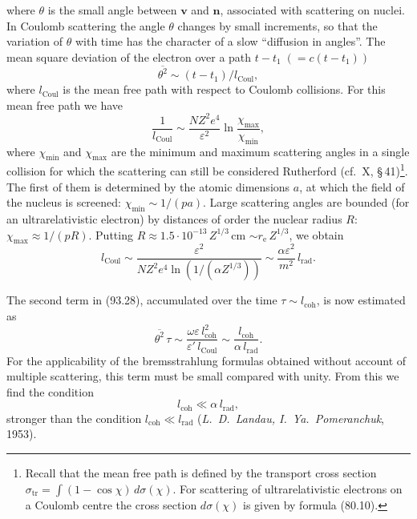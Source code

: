 
where $\theta$ is the small angle between $\mathbf{v}$ and $\mathbf{n}$, associated with scattering on nuclei. In Coulomb scattering the angle $\theta$ changes by small increments, so that the variation of $\theta$ with time has the character of a slow ``diffusion in angles''. The mean square deviation of the electron over a path $t - t_1\;(= c(t - t_1))$
\[
\overline{\theta^2} \sim (t - t_1)/l_\text{Coul},
\]
where $l_\text{Coul}$ is the mean free path with respect to Coulomb collisions. For this mean free path we have
\[
\frac{1}{l_\text{Coul}} \sim \frac{NZ^2e^4}{\varepsilon^2}\ln\frac{\chi_\text{max}}{\chi_\text{min}},
\]
where $\chi_\text{min}$ and $\chi_\text{max}$ are the minimum and maximum scattering angles in a single collision for which the scattering can still be considered Rutherford (cf.\ X, \S\,41)\footnote{Recall that the mean free path is defined by the transport cross section $\sigma_\text{tr} = \int(1 - \cos\chi)\,d\sigma(\chi)$. For scattering of ultrarelativistic electrons on a Coulomb centre the cross section $d\sigma(\chi)$ is given by formula (80.10).}. The first of them is determined by the atomic dimensions $a$, at which the field of the nucleus is screened: $\chi_\text{min} \sim 1/(pa)$. Large scattering angles are bounded (for an ultrarelativistic electron) by distances of order the nuclear radius $R$: $\chi_\text{max} \approx 1/(pR)$. Putting $R \approx 1.5\cdot 10^{-13}\,Z^{1/3}$\,cm $\sim r_\mathrm{e}\,Z^{1/3}$, we obtain
\begin{equation}
l_\text{Coul} \sim \frac{\varepsilon^2}{NZ^2e^4\ln(1/(\alpha Z^{1/3}))} \sim \frac{\alpha\varepsilon^2}{m^2}\,l_\text{rad}.
\label{eq:93.29}
\end{equation}

The second term in (93.28), accumulated over the time $\tau \sim l_\text{coh}$, is now estimated as
\[
\overline{\theta^2}\,\tau \sim \frac{\omega\varepsilon\,l_\text{coh}^2}{\varepsilon'\,l_\text{Coul}} \sim \frac{l_\text{coh}}{\alpha\,l_\text{rad}}.
\]
For the applicability of the bremsstrahlung formulas obtained without account of multiple scattering, this term must be small compared with unity. From this we find the condition
\begin{equation}
l_\text{coh} \ll \alpha\,l_\text{rad},
\label{eq:93.30}
\end{equation}
stronger than the condition $l_\text{coh} \ll l_\text{rad}$ (\emph{L.~D.~Landau, I.~Ya.~Pomeranchuk}, 1953).
